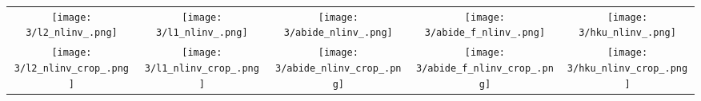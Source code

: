 \begin{tabular}{c @{\hskip 0pt} c @{\hskip 0pt} c @{\hskip 0pt} c @{\hskip 0pt} c}
    \texttt{[image: 3/l2\_nlinv\_.png]}&
    \texttt{[image: 3/l1\_nlinv\_.png]}&
    \texttt{[image: 3/abide\_nlinv\_.png]}&
    \texttt{[image: 3/abide\_f\_nlinv\_.png]}&
    \texttt{[image: 3/hku\_nlinv\_.png]}\\
    \texttt{[image: 3/l2\_nlinv\_crop\_.png]}&
    \texttt{[image: 3/l1\_nlinv\_crop\_.png]}&
    \texttt{[image: 3/abide\_nlinv\_crop\_.png]}&
    \texttt{[image: 3/abide\_f\_nlinv\_crop\_.png]}&
    \texttt{[image: 3/hku\_nlinv\_crop\_.png]}
\end{tabular}


